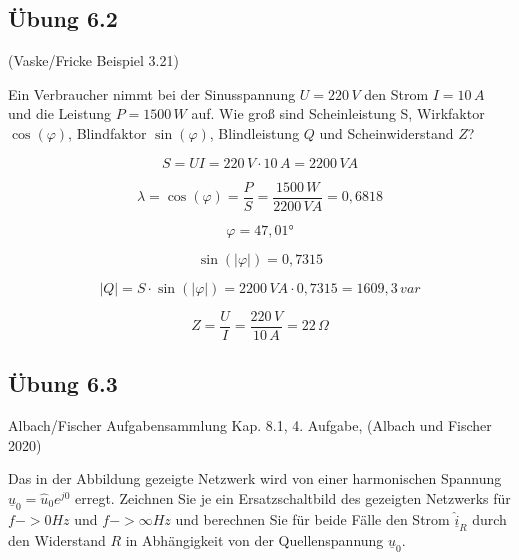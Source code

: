 \documentclass[
  ngerman,
  letterpaper,
]{scrbook}
\begin{document}
\subsection{Übung 6.2}\label{uxfcbung-6.2}

(Vaske/Fricke Beispiel 3.21)

Ein Verbraucher nimmt bei der Sinusspannung \(U = 220\,V\) den Strom
\(I = 10\,A\) und die Leistung \(P = 1500\,W\) auf. Wie groß sind
Scheinleistung S, Wirkfaktor \(\cos(\varphi)\), Blindfaktor
\(\sin(\varphi)\), Blindleistung \(Q\) und Scheinwiderstand \(Z\)?

\begin{tcolorbox}[enhanced jigsaw, titlerule=0mm, rightrule=.15mm, toprule=.15mm, colback=white, toptitle=1mm, bottomrule=.15mm, coltitle=black, leftrule=.75mm, arc=.35mm, colbacktitle=quarto-callout-caution-color!10!white, opacityback=0, bottomtitle=1mm, colframe=quarto-callout-caution-color-frame, opacitybacktitle=0.6, breakable, title=\textcolor{quarto-callout-caution-color}{\faFire}\hspace{0.5em}{Lösung 6.2}, left=2mm]

\[S = U I = 220\,V \cdot 10\,A = 2200\,VA\]

\[\lambda = \cos(\varphi) = \frac{P}{S} = \frac{1500\,W}{2200\,VA} = 0,6818\]

\[\varphi = 47,01°\]

\[\sin(|\varphi|) = 0,7315\]

\[|Q| = S \cdot \sin(|\varphi|) = 2200\,VA \cdot 0,7315 = 1609,3\,var\]

\[Z = \frac{U}{I} = \frac{220\,V}{10\,A} = 22\,\Omega\]

\end{tcolorbox}

\subsection{Übung 6.3}\label{uxfcbung-6.3}

Albach/Fischer Aufgabensammlung Kap. 8.1, 4. Aufgabe, (Albach und
Fischer 2020)

Das in der Abbildung gezeigte Netzwerk wird von einer harmonischen
Spannung \(\underline{\hat{u}}_0 = \hat{u}_0 e^{j 0}\) erregt. Zeichnen
Sie je ein Ersatzschaltbild des gezeigten Netzwerks für \(f -> 0 Hz\)
und \(f -> \infty Hz\) und berechnen Sie für beide Fälle den Strom
\(\underline{\hat{i}}_R\) durch den Widerstand \(R\) in Abhängigkeit von
der Quellenspannung \(\underline{\hat{u}}_0\).
\end{document}
